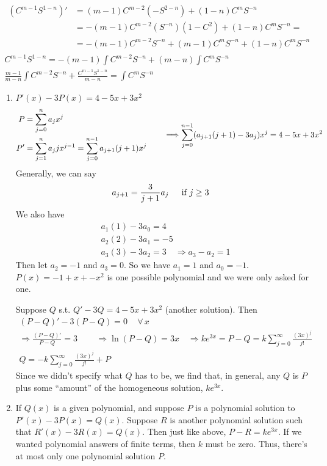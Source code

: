 \documentclass[twoside]{amsart}
\theoremstyle{plain}
\theoremstyle{definition}
\newcommand{\exercisehead}[1]
  {\smallskip
   \noindent{\small\bf Exercise #1.}}
\begin{document}
\exercisehead{33} 
\[
\begin{gathered}
  \begin{aligned}
    (C^{m-1}S^{1-n})' & = (m-1)C^{m-2}(-S^{2-n}) + (1-n)C^m S^{-n} \\
    & = -(m-1)C^{m-2}(S^{-n})(1-C^2) + (1-n)C^m S^{-n} = \\
    & = -(m-1)C^{m-2}S^{-n} + (m-1) C^m S^{-n} + (1-n)C^m S^{-n} 
  \end{aligned} \\
  C^{m-1}S^{1-n} = - (m-1) \int C^{m-2}S^{-n} + (m-n)\int C^m S^{-n} \\
  \frac{m-1}{m-n} \int C^{m-2}S^{-n} + \frac{ C^{m-1}S^{1-n} }{ m-n} = \int C^m S^{-n}
\end{gathered}
\]

\exercisehead{34}
\begin{enumerate}
  \item $P'(x) - 3 P(x) = 4 - 5 x + 3x^2$
    \[
      \begin{aligned}
	P & = \sum_{j=0}^n a_j x^j \\
	P' & = \sum_{j=1}^n a_j jx^{j-1} = \sum_{j=0}^{n-1} a_{j+1}(j+1)x^j 
      \end{aligned} \quad \quad \, \Longrightarrow \sum_{j=0}^{n-1} (a_{j+1}(j+1) - 3a_j) x^j  = 4 - 5 x + 3x^2 \\
    \] 
Generally, we can say
\[
a_{j+1} = \frac{3}{j+1} a_j \quad \, \text{ if $ j \geq 3$ }
\]
We also have
\[
\begin{aligned}
  & a_1 (1) - 3a_0 = 4  \\
  & a_2(2) - 3a_1 = -5 \\
  & a_3(3) - 3a_2 = 3 \quad \Longrightarrow a_3 - a_2 = 1 
\end{aligned}
\]
Then let $a_2 = -1$ and $a_3 = 0$.  So we have $a_1 = 1$ and $a_0 = -1$.  $P(x) = -1 + x + -x^2$ is one possible polynomial and we were only asked for one.  

Suppose $Q$ s.t. $Q'-3Q = 4-5x+3x^2$ (another solution).  Then
\[
\begin{gathered}
  (P-Q)' - 3 (P-Q) = 0 \quad \, \forall \, x \\
  \Longrightarrow \frac{ (P-Q)' }{ P-Q } = 3  \quad \quad \, \Longrightarrow \ln{ (P-Q) } = 3 x \quad \Longrightarrow k e^{3x} = P - Q = k \sum_{j=0}^{\infty} \frac{ (3x)^j}{j! }  \\
  Q = -k \sum_{j=0}^{\infty} \frac{ (3x)^j}{j!} + P 
\end{gathered}
\]
Since we didn't specify what $Q$ has to be, we find that, in general, any $Q$ is $P$ plus some ``amount'' of the homogeneous solution, $ke^{3x}$.  
  \item If $Q(x)$ is a given polynomial, and suppose $P$ is a polynomial solution to $P'(x) - 3P(x) = Q(x)$.  Suppose $R$ is another polynomial solution such that $R'(x)-3R(x) = Q(x)$.  Then just like above, $P-R = ke^{3x}$.  If we wanted polynomial answers of finite terms, then $k$ must be zero.  Thus, there's at most only one polynomial solution $P$.  
\end{enumerate}
\end{document}
